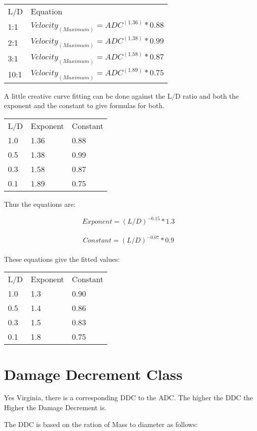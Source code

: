 \begin{tabular}{||l|l||}
L/D			& Equation \\
1:1			& \(Velocity_{(Maximum)} = ADC^{(1.36)} * 0.88 \)\\
2:1			& \(Velocity_{(Maximum)} = ADC^{(1.38)} * 0.99 \) \\
3:1			& \(Velocity_{(Maximum)} = ADC^{(1.58)} * 0.87 \) \\
10:1		& \(Velocity_{(Maximum)} = ADC^{(1.89)} * 0.75 \) \\
\end{tabular}

A little creative curve fitting can be done against the L/D ratio 
and both the exponent and the constant to give formulas for both.

\begin{tabular}{||l|l|l||}
L/D	& Exponent	& Constant \\
1.0	& 1.36	   & 0.88 \\
0.5 & 1.38     & 0.99 \\
0.3 & 1.58     & 0.87 \\
0.1 & 1.89     & 0.75 \\
\end{tabular}

Thus the equations are:

\[Exponent = (L/D)^{-0.15} * 1.3 \] \\
\[Constant = (L/D)^{-0.07} * 0.9 \] \\

These equations give the fitted values:

\begin{tabular}{||l|l|l||}
L/D	& Exponent	& Constant \\
1.0 & 1.3       &  0.90 \\
0.5 & 1.4       &  0.86 \\
0.3 & 1.5       &  0.83 \\
0.1 & 1.8       &  0.75 \\
\end{tabular}

\section{Damage Decrement Class}

Yes Virginia, there is a corresponding DDC to the ADC. The higher 
the DDC the Higher the Damage Decrement is.

The DDC is based on the ration of Mass to diameter as follows:

